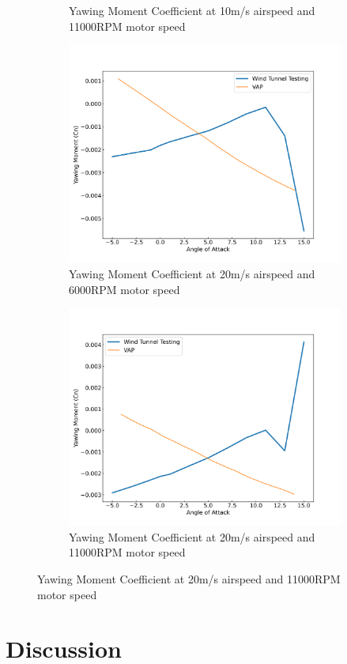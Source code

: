 \begin{figure}[H]
\begin{subfigure}[b]{0.467\textwidth}
        \caption{Yawing Moment Coefficient at 10m/s airspeed and 11000RPM motor speed}
        \label{fig:VAP_pusherr_Cn_10ms_11000}
    \end{subfigure}
    \begin{subfigure}[b]{0.467\textwidth}
        \centering
        \includegraphics[width=\textwidth]{05_Results/VAP/pusher/Cn/20ms_6000RPM_Cn.png}
        \caption{Yawing Moment Coefficient at 20m/s airspeed and 6000RPM motor speed}
        \label{fig:VAP_pusher_Cn_20ms_6000}
    \end{subfigure}
    \begin{subfigure}[b]{0.467\textwidth}
        \centering
        \includegraphics[width=\textwidth]{05_Results/VAP/pusher/Cn/20ms_11000RPM_Cn.png}
        \caption{Yawing Moment Coefficient at 20m/s airspeed and 11000RPM motor speed}
        \label{fig:VAP_pusher_Cn_20ms_11000}
    \end{subfigure}
\end{figure}


\section{Discussion}